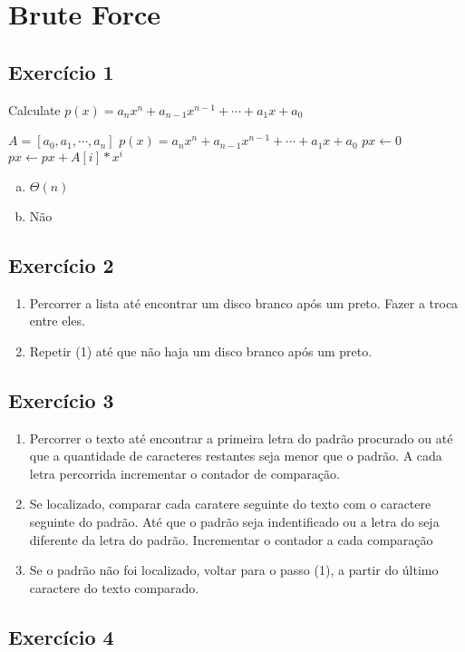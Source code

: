 \section{Brute Force}\label{sec:brute_force}

\subsection{Exercício 1}\label{sec:exer1}

\begin{algorithm}
  \caption{Calculate $p(x) = a_{n}x{^n}+a_{n-1}x^{n-1}+\cdots+a_{1}x+a_{0}$}
  \begin{algorithmic}
    \REQUIRE $A=[a_{0}, a_{1}, \cdots, a_{n}]$
    \ENSURE $p(x) = a_{n}x{^n}+a_{n-1}x^{n-1}+\cdots+a_{1}x+a_{0}$
    \STATE $px \leftarrow 0$
      \STATE $px \leftarrow px + A[i]*x^{i}$
    \ENDFOR
  \end{algorithmic}
\end{algorithm}

\begin{enumerate}[a)]
  \item $\Theta(n)$
  \item Não
\end{enumerate}


\subsection{Exercício 2}\label{sec:exer2}

\begin{enumerate}
  \item Percorrer a lista até encontrar um disco branco após um preto. Fazer a
  troca entre eles.
  \item Repetir (1) até que não haja um disco branco após um preto.
\end{enumerate}


\subsection{Exercício 3}\label{sec:exer3}

\begin{enumerate}
  \item Percorrer o texto até encontrar a primeira letra do padrão procurado ou
  até que a quantidade de caracteres restantes seja menor que o padrão.
  A cada letra percorrida incrementar o contador de comparação.
  \item Se localizado, comparar cada caratere seguinte do texto com o caractere
  seguinte do padrão. Até que o padrão seja indentificado ou a letra do seja diferente
  da letra do padrão. Incrementar o contador a cada comparação
  \item Se o padrão não foi localizado, voltar para o passo (1), a partir do último
  caractere do texto comparado.
\end{enumerate}


\subsection{Exercício 4}\label{sec:exer4}
